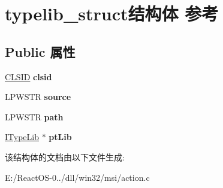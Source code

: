 \hypertarget{structtypelib__struct}{}\section{typelib\+\_\+struct结构体 参考}
\label{structtypelib__struct}
\subsection*{Public 属性}
\begin{DoxyCompactItemize}
\item 
\mbox{\label{structtypelib__struct_a0ef285aa6e93826b96c088ab9baa8248}} 
\hyperlink{struct___i_i_d}{C\+L\+S\+ID} {\bfseries clsid}
\item 
\mbox{\label{structtypelib__struct_a1d5270f8ade2fb6d3b770750ca50f1e6}} 
L\+P\+W\+S\+TR {\bfseries source}
\item 
\mbox{\label{structtypelib__struct_a2c121916f2fc30afeeb895fae1dcb649}} 
L\+P\+W\+S\+TR {\bfseries path}
\item 
\mbox{\label{structtypelib__struct_aa756bed1ba0fcb005807a06fe1b437c7}} 
\hyperlink{interface_i_type_lib}{I\+Type\+Lib} $\ast$ {\bfseries pt\+Lib}
\end{DoxyCompactItemize}


该结构体的文档由以下文件生成\+:\begin{DoxyCompactItemize}
\item 
E\+:/\+React\+O\+S-\/0../dll/win32/msi/action.\+c\end{DoxyCompactItemize}

